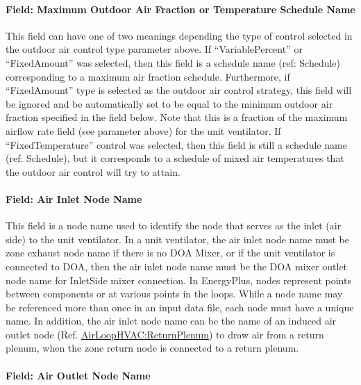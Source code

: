 \paragraph{Field: Maximum Outdoor Air Fraction or Temperature Schedule Name}\label{field-maximum-outdoor-air-fraction-or-temperature-schedule-name-000}

This field can have one of two meanings depending the type of control selected in the outdoor air control type parameter above. If ``VariablePercent'' or ``FixedAmount'' was selected, then this field is a schedule name (ref: Schedule) corresponding to a maximum air fraction schedule. Furthermore, if ``FixedAmount'' type is selected as the outdoor air control strategy, this field will be ignored and be automatically set to be equal to the minimum outdoor air fraction specified in the field below. Note that this is a fraction of the maximum airflow rate field (see parameter above) for the unit ventilator. If ``FixedTemperature'' control was selected, then this field is still a schedule name (ref: Schedule), but it corresponds to a schedule of mixed air temperatures that the outdoor air control will try to attain.

\paragraph{Field: Air Inlet Node Name}\label{field-air-inlet-node-name-1-007}

This field is a node name used to identify the node that serves as the inlet (air side) to the unit ventilator. In a unit ventilator, the air inlet node name must be zone exhaust node name if there is no DOA Mixer, or if the unit ventilator is connected to DOA, then the air inlet node name must be the DOA mixer outlet node name for InletSide mixer connection. In EnergyPlus, nodes represent points between components or at various points in the loops. While a node name may be referenced more than once in an input data file, each node must have a unique name. In addition, the air inlet node name can be the name of an induced air outlet node (Ref. \hyperref[airloophvacreturnplenum]{AirLoopHVAC:ReturnPlenum}) to draw air from a return plenum, when the zone return node is connected to a return plenum.

\paragraph{Field: Air Outlet Node Name}\label{field-air-outlet-node-name-1-006}

